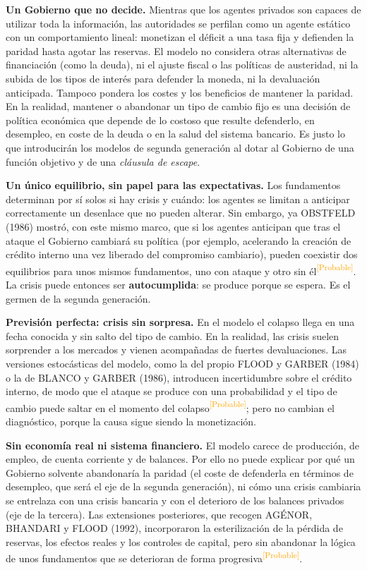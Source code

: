 \documentclass[10pt,a4paper]{article}
\begin{document}
\textbf{Un Gobierno que no decide.} Mientras que los agentes privados son capaces de utilizar toda la información, las autoridades se perfilan como un agente estático con un comportamiento lineal: monetizan el déficit a una tasa fija y defienden la paridad hasta agotar las reservas. El modelo no considera otras alternativas de financiación (como la deuda), ni el ajuste fiscal o las políticas de austeridad, ni la subida de los tipos de interés para defender la moneda, ni la devaluación anticipada. Tampoco pondera los costes y los beneficios de mantener la paridad. En la realidad, mantener o abandonar un tipo de cambio fijo es una decisión de política económica que depende de lo costoso que resulte defenderlo, en desempleo, en coste de la deuda o en la salud del sistema bancario. Es justo lo que introducirán los modelos de segunda generación al dotar al Gobierno de una función objetivo y de una \textit{cláusula de escape}.

\textbf{Un único equilibrio, sin papel para las expectativas.} Los fundamentos determinan por sí solos si hay crisis y cuándo: los agentes se limitan a anticipar correctamente un desenlace que no pueden alterar. Sin embargo, ya OBSTFELD (1986) mostró, con este mismo marco, que si los agentes anticipan que tras el ataque el Gobierno cambiará su política (por ejemplo, acelerando la creación de crédito interno una vez liberado del compromiso cambiario), pueden coexistir dos equilibrios para unos mismos fundamentos, uno con ataque y otro sin él\textcolor{orange}{\textsuperscript{[Probable]}}. La crisis puede entonces ser \textbf{autocumplida}: se produce porque se espera. Es el germen de la segunda generación.

\textbf{Previsión perfecta: crisis sin sorpresa.} En el modelo el colapso llega en una fecha conocida y sin salto del tipo de cambio. En la realidad, las crisis suelen sorprender a los mercados y vienen acompañadas de fuertes devaluaciones. Las versiones estocásticas del modelo, como la del propio FLOOD y GARBER (1984) o la de BLANCO y GARBER (1986), introducen incertidumbre sobre el crédito interno, de modo que el ataque se produce con una probabilidad y el tipo de cambio puede saltar en el momento del colapso\textcolor{orange}{\textsuperscript{[Probable]}}; pero no cambian el diagnóstico, porque la causa sigue siendo la monetización.

\textbf{Sin economía real ni sistema financiero.} El modelo carece de producción, de empleo, de cuenta corriente y de balances. Por ello no puede explicar por qué un Gobierno solvente abandonaría la paridad (el coste de defenderla en términos de desempleo, que será el eje de la segunda generación), ni cómo una crisis cambiaria se entrelaza con una crisis bancaria y con el deterioro de los balances privados (eje de la tercera). Las extensiones posteriores, que recogen AGÉNOR, BHANDARI y FLOOD (1992), incorporaron la esterilización de la pérdida de reservas, los efectos reales y los controles de capital, pero sin abandonar la lógica de unos fundamentos que se deterioran de forma progresiva\textcolor{orange}{\textsuperscript{[Probable]}}.
\end{document}
